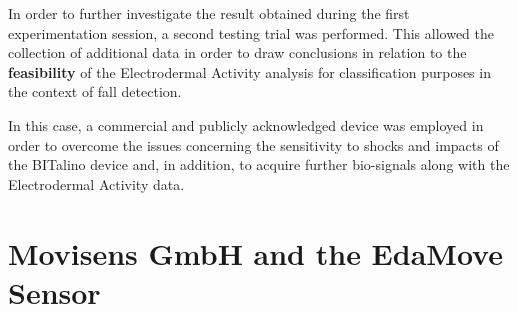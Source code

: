 \label{ch:collection}

%
%

In order to further investigate the result obtained during the first experimentation session, a second testing trial was performed. This allowed the collection of additional data in order to draw conclusions in relation to the \textbf{feasibility} of the Electrodermal Activity analysis for classification purposes in the context of fall detection.

In this case, a commercial and publicly acknowledged device was employed in order to overcome the issues concerning the sensitivity to shocks and impacts of the BITalino device and, in addition, to acquire further bio-signals along with the Electrodermal Activity data.

\section{Movisens GmbH and the EdaMove Sensor}\label{sec:movisens}


